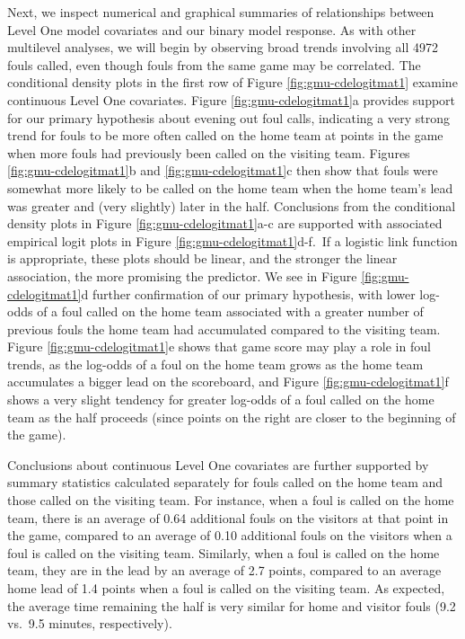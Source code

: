 \documentclass[
]{krantz}
\begin{document}
Next, we inspect numerical and graphical summaries of relationships between Level One model covariates and our binary model response. As with other multilevel analyses, we will begin by observing broad trends involving all 4972 fouls called, even though fouls from the same game may be correlated. The conditional density plots in the first row of Figure \ref{fig:gmu-cdelogitmat1} examine continuous Level One covariates. Figure \ref{fig:gmu-cdelogitmat1}a provides support for our primary hypothesis about evening out foul calls, indicating a very strong trend for fouls to be more often called on the home team at points in the game when more fouls had previously been called on the visiting team. Figures \ref{fig:gmu-cdelogitmat1}b and \ref{fig:gmu-cdelogitmat1}c then show that fouls were somewhat more likely to be called on the home team when the home team's lead was greater and (very slightly) later in the half. Conclusions from the conditional density plots in Figure \ref{fig:gmu-cdelogitmat1}a-c are supported with associated empirical logit plots in Figure \ref{fig:gmu-cdelogitmat1}d-f.~If a logistic link function is appropriate, these plots should be linear, and the stronger the linear association, the more promising the predictor. We see in Figure \ref{fig:gmu-cdelogitmat1}d further confirmation of our primary hypothesis, with lower log-odds of a foul called on the home team associated with a greater number of previous fouls the home team had accumulated compared to the visiting team. Figure \ref{fig:gmu-cdelogitmat1}e shows that game score may play a role in foul trends, as the log-odds of a foul on the home team grows as the home team accumulates a bigger lead on the scoreboard, and Figure \ref{fig:gmu-cdelogitmat1}f shows a very slight tendency for greater log-odds of a foul called on the home team as the half proceeds (since points on the right are closer to the beginning of the game).

Conclusions about continuous Level One covariates are further supported by summary statistics calculated separately for fouls called on the home team and those called on the visiting team. For instance, when a foul is called on the home team, there is an average of 0.64 additional fouls on the visitors at that point in the game, compared to an average of 0.10 additional fouls on the visitors when a foul is called on the visiting team. Similarly, when a foul is called on the home team, they are in the lead by an average of 2.7 points, compared to an average home lead of 1.4 points when a foul is called on the visiting team. As expected, the average time remaining the half is very similar for home and visitor fouls (9.2 vs.~9.5 minutes, respectively).
\end{document}
